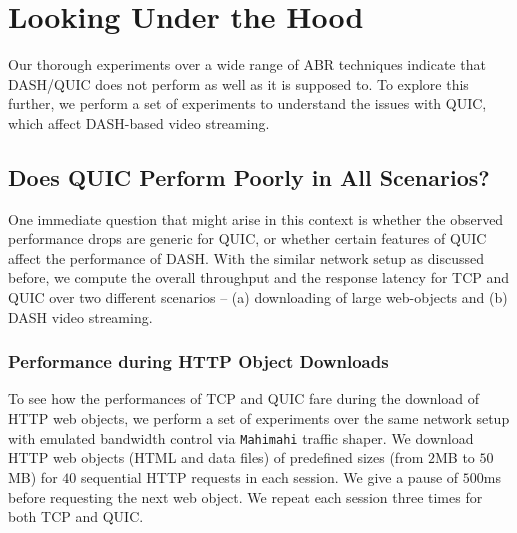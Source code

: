 \section{Looking Under the Hood}
Our thorough experiments over a wide range of ABR techniques indicate that DASH/QUIC does not perform as well as it is supposed to. To explore this further, we perform a set of experiments to understand the issues with QUIC, which affect DASH-based video streaming.

\subsection{Does QUIC Perform Poorly in All Scenarios?}
One immediate question that might arise in this context is whether the observed performance drops are generic for QUIC, or whether certain features of QUIC affect the performance of DASH. With the similar network setup as discussed before, we compute the overall throughput and the response latency for TCP and QUIC over two different scenarios -- (a) downloading of large web-objects and (b) DASH video streaming. 


\subsubsection{Performance during HTTP Object Downloads}
To see how the performances of TCP and QUIC fare during the download of HTTP web objects, we perform a set of experiments over the same network setup with emulated bandwidth control via {\tt Mahimahi} traffic shaper. We download HTTP web objects (HTML and data files) of predefined sizes (from $2$MB to $50$MB) for $40$ sequential HTTP requests in each session. We give a pause of $500$ms before requesting the next web object. We repeat each session three times for both TCP and QUIC. 


